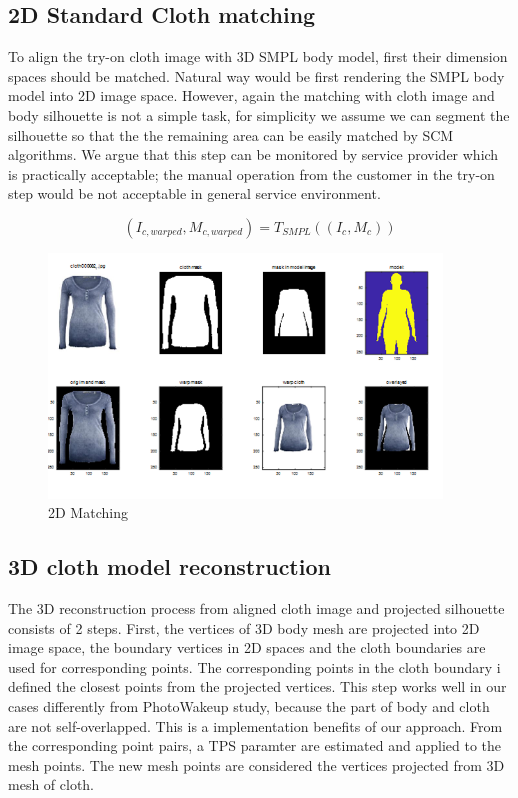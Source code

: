 \documentclass[runningheads]{llncs}
\begin{document}
\subsection{2D Standard Cloth matching}


To align the try-on cloth image with 3D SMPL body model, first their dimension spaces should be matched. Natural way would be first rendering the SMPL body model into 2D image space. However, again the matching with cloth image and body silhouette is not a simple task, for simplicity we assume we can segment the silhouette so that the the remaining area can be easily matched by SCM algorithms. We argue that this step can be monitored by service provider which is practically acceptable; the manual operation from the customer in the try-on step would be not acceptable in general service environment.   

\begin{equation}
(I_{c, warped}, M_{c, warped})  = T_{SMPL} ((I_c, M_c))
\end{equation}


\begin{figure}
\centering
\includegraphics[height=6.5cm]{figures/2dmatching.png}   %
\caption{2D Matching}
\label{fig:2DmatchingOfClothAndBody}
\end{figure}


\subsection{3D cloth model reconstruction }


The 3D reconstruction process from aligned cloth image and projected silhouette consists of 2 steps. First, the vertices of 3D body mesh are projected into 2D image space, the boundary  vertices in 2D spaces and the cloth boundaries are used for corresponding points. The corresponding points in the cloth boundary i defined the closest points from the projected vertices.  This step works well in our cases differently from PhotoWakeup study, because the part of body and cloth are not self-overlapped. This is a implementation benefits of our approach. From the corresponding point pairs, a TPS paramter are estimated and applied to the mesh points. The new mesh points are considered the vertices projected from 3D mesh of cloth.    
\end{document}
